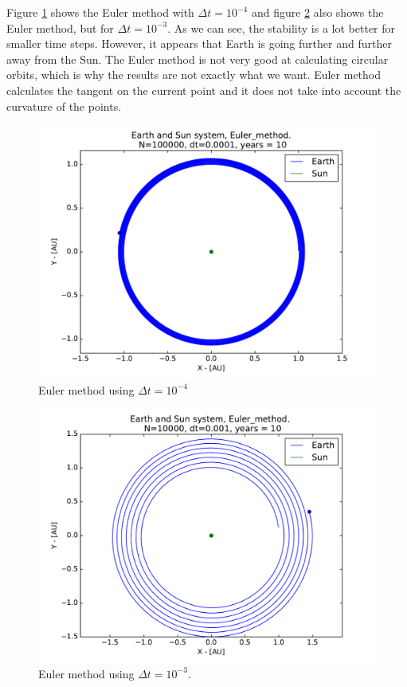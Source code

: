 \documentclass[12pt]{article}
\begin{document}
Figure \ref{fig:balle} shows the Euler method with $\Delta t = 10^{-4}$ and figure \ref{fig:balle1} also shows the Euler method, but for $\Delta t = 10^{-3}$. As we can see, the stability is a lot better for smaller time steps. However, it appears that Earth is going further and further away from the Sun. The Euler method is not very good at calculating circular orbits, which is why the results are not exactly what we want. Euler method calculates the tangent on the current point and it does not take into account the curvature of the points.

\begin{figure}[!h]
\centering
\includegraphics[width=\linewidth]{Plots/Earth_Sun_Euler_method.pdf}
\caption{Euler method using $\Delta t = 10^{-4}$}
\label{fig:balle}
\end{figure}

\begin{figure}[!h]
\centering
\includegraphics[width=\linewidth]{Plots/Earth_Sun_Euler_method_larger_dt.pdf}
\caption{Euler method using $\Delta t = 10^{-3}$.}
\label{fig:balle1}
\end{figure}
\end{document}
